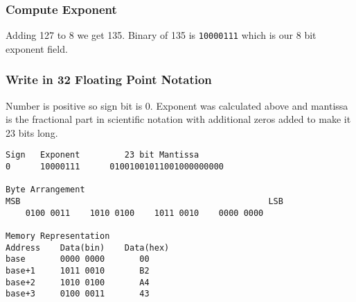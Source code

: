 \documentclass[12pt,a4paper]{article}
\begin{document}
\subsubsection{Compute Exponent}
Adding 127 to 8 we get 135. Binary of 135 is \verb|10000111| which is our 8 bit exponent field.
\subsubsection{Write in 32 Floating Point Notation}
Number is positive so sign bit is 0. Exponent was calculated above and mantissa is the fractional part in scientific notation with additional zeros added to make it 23 bits long.
\begin{verbatim}
Sign   Exponent         23 bit Mantissa
0      10000111      01001001011001000000000

Byte Arrangement
MSB                                                  LSB
    0100 0011    1010 0100    1011 0010    0000 0000

Memory Representation
Address    Data(bin)    Data(hex)
base       0000 0000       00
base+1     1011 0010       B2
base+2     1010 0100       A4
base+3     0100 0011       43
\end{verbatim}
\end{document}
